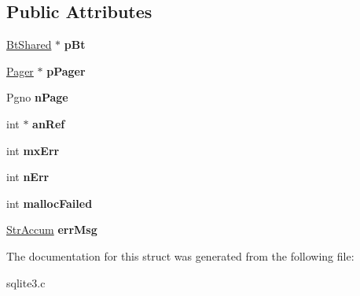 \subsection*{Public Attributes}
\begin{DoxyCompactItemize}
\item 
\hypertarget{struct_integrity_ck_a65f03f54514f504bd871bb2ccd3da188}{\hyperlink{struct_bt_shared}{Bt\-Shared} $\ast$ {\bfseries p\-Bt}}\label{struct_integrity_ck_a65f03f54514f504bd871bb2ccd3da188}

\item 
\hypertarget{struct_integrity_ck_a87e7f8b012b61b61fae359269cbacce4}{\hyperlink{struct_pager}{Pager} $\ast$ {\bfseries p\-Pager}}\label{struct_integrity_ck_a87e7f8b012b61b61fae359269cbacce4}

\item 
\hypertarget{struct_integrity_ck_a04f496ef7239aea6dccb6a861bb5a798}{Pgno {\bfseries n\-Page}}\label{struct_integrity_ck_a04f496ef7239aea6dccb6a861bb5a798}

\item 
\hypertarget{struct_integrity_ck_a8bf40e4a2f13ad3e101f1a4dd7a08ff6}{int $\ast$ {\bfseries an\-Ref}}\label{struct_integrity_ck_a8bf40e4a2f13ad3e101f1a4dd7a08ff6}

\item 
\hypertarget{struct_integrity_ck_a9daa97cdcb1366c503451ab2af9e7ba6}{int {\bfseries mx\-Err}}\label{struct_integrity_ck_a9daa97cdcb1366c503451ab2af9e7ba6}

\item 
\hypertarget{struct_integrity_ck_a52c815a1d19be87d0ab4dc0a4e4d38e2}{int {\bfseries n\-Err}}\label{struct_integrity_ck_a52c815a1d19be87d0ab4dc0a4e4d38e2}

\item 
\hypertarget{struct_integrity_ck_a8e448c1d6483a0326a7ec39291782030}{int {\bfseries malloc\-Failed}}\label{struct_integrity_ck_a8e448c1d6483a0326a7ec39291782030}

\item 
\hypertarget{struct_integrity_ck_a1e9b79bb1d7b22a840001333200a950e}{\hyperlink{struct_str_accum}{Str\-Accum} {\bfseries err\-Msg}}\label{struct_integrity_ck_a1e9b79bb1d7b22a840001333200a950e}

\end{DoxyCompactItemize}


The documentation for this struct was generated from the following file\-:\begin{DoxyCompactItemize}
\item 
sqlite3.\-c\end{DoxyCompactItemize}
